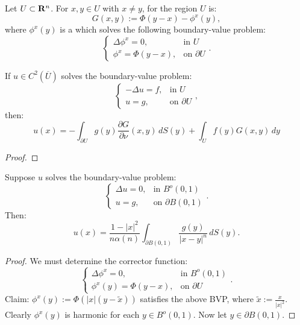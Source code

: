 \begin{definition}
	Let $U \subset \mathbf{R}^n$. For $x,y \in U$ with $x \neq y$,  for the region $U$ is:
	\[
		G(x,y) := \Phi(y-x) - \phi^x(y),
	\] 
	where $\phi^x(y)$ is a  which solves the following boundary-value problem:
	\[
		\begin{cases}
			\Delta \phi^x = 0, & \text{in }U \\
			\phi^x = \Phi(y-x),& \text{on }\partial U
		\end{cases}.
	\] 
\end{definition}

\begin{theorem}
	If $u \in C^2(\overline{U})$ solves the boundary-value problem:
	\[
		\begin{cases}
			-\Delta u = f, & \text{in }U\\
			u=g,& \text{on }\partial U
		\end{cases},
	\] 
	then:
	\[
		u(x) = -\int_{\partial U}^{} g(y) \frac{\partial G}{\partial \nu}(x,y)\,dS(y) + \int_{U}^{} f(y) G(x,y)\,dy
	\] 
\end{theorem}
	{\color{red}
	\begin{proof}
			
	\end{proof}}

\begin{theorem}
	Suppose $u$ solves the boundary-value problem:
	\[
		\begin{cases}
			\Delta u = 0,&\text{in }B^o(0,1) \\
			u=g,& \text{on }\partial B(0,1)
		\end{cases}.
	\] 
	Then:
	\[
		u(x) = \frac{1-|x|^2}{n \alpha(n)} \int_{\partial B(0,1)}^{} \frac{g(y)}{|x-y|^n}\,dS(y).
	\] 
\end{theorem}
	\begin{proof}
		We must determine the corrector function:
		\[
			\begin{cases}
				\Delta \phi^x = 0,& \text{in }B^o(0,1) \\
				\phi^x(y) = \Phi(y-x),&\text{on }\partial U
			\end{cases}.
		\] 
		Claim: $\phi^x(y) := \Phi \left( |x|(y-\tilde{x} )\right)$ satisfies the above BVP, where $\tilde{x} := \frac{x}{|x|^2}$. Clearly $\phi^x(y)$ is harmonic for each $y \in B^o(0,1)$. Now let $y \in \partial B(0,1)$. 
	\end{proof}









